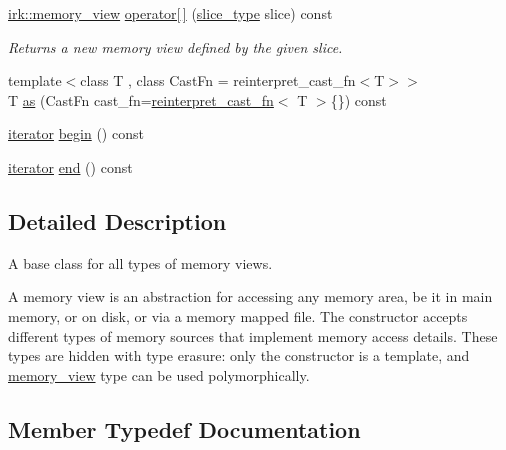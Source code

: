 \begin{DoxyCompactItemize}
\mbox{\hyperlink{classirk_1_1memory__view}{irk\+::memory\+\_\+view}} \mbox{\hyperlink{classirk_1_1memory__view_ae16ba32b9419a8918762132186a00463}{operator\mbox{[}$\,$\mbox{]}}} (\mbox{\hyperlink{classirk_1_1memory__view_ac0c1d9600bf81e8cb861a89ab104a43c}{slice\+\_\+type}} slice) const
\begin{DoxyCompactList}\small\item\em Returns a new memory view defined by the given slice. \end{DoxyCompactList}\item 
{\footnotesize template$<$class T , class Cast\+Fn  = reinterpret\+\_\+cast\+\_\+fn$<$\+T$>$$>$ }\\T \mbox{\hyperlink{classirk_1_1memory__view_ae9d042dabe259ef35ac2fec319c40b57}{as}} (Cast\+Fn cast\+\_\+fn=\mbox{\hyperlink{structirk_1_1reinterpret__cast__fn}{reinterpret\+\_\+cast\+\_\+fn}}$<$ T $>$\{\}) const
\item 
\mbox{\hyperlink{classirk_1_1memory__view_1_1iterator}{iterator}} \mbox{\hyperlink{classirk_1_1memory__view_a41d2227984ac0284ec52588a57bd297c}{begin}} () const
\item 
\mbox{\hyperlink{classirk_1_1memory__view_1_1iterator}{iterator}} \mbox{\hyperlink{classirk_1_1memory__view_a393e04a837ff706e408fbea11219d7ed}{end}} () const
\end{DoxyCompactItemize}


\subsection{Detailed Description}
A base class for all types of memory views. 

A memory view is an abstraction for accessing any memory area, be it in main memory, or on disk, or via a memory mapped file. The constructor accepts different types of memory sources that implement memory access details. These types are hidden with type erasure\+: only the constructor is a template, and {\ttfamily \mbox{\hyperlink{classirk_1_1memory__view}{memory\+\_\+view}}} type can be used polymorphically. 

\subsection{Member Typedef Documentation}
\mbox{\label{classirk_1_1memory__view_a061864050dba61b052062ec459822885}} 
